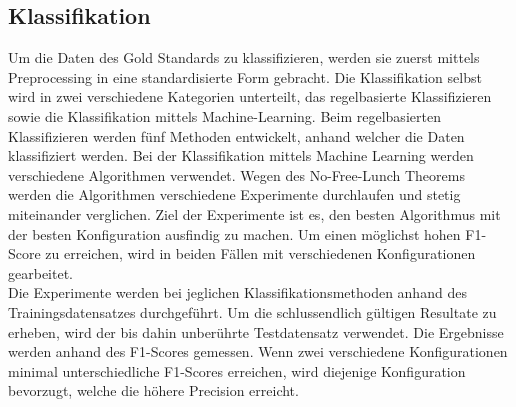 \subsection{Klassifikation}
Um die Daten des Gold Standards zu klassifizieren, werden sie zuerst mittels Preprocessing in eine standardisierte Form gebracht.
Die Klassifikation selbst wird in zwei verschiedene Kategorien unterteilt, das regelbasierte Klassifizieren sowie die Klassifikation mittels Machine-Learning.
Beim regelbasierten Klassifizieren werden fünf Methoden entwickelt, anhand welcher die Daten klassifiziert werden.
Bei der Klassifikation mittels Machine Learning werden verschiedene Algorithmen verwendet.
Wegen des \glqq No-Free-Lunch\grqq{} Theorems werden die Algorithmen verschiedene Experimente durchlaufen und stetig miteinander verglichen.
Ziel der Experimente ist es, den besten Algorithmus mit der besten Konfiguration ausfindig zu machen.
Um einen möglichst hohen F1-Score zu erreichen, wird in beiden Fällen mit verschiedenen Konfigurationen gearbeitet.\\
Die Experimente werden bei jeglichen Klassifikationsmethoden anhand des Trainingsdatensatzes durchgeführt.
Um die schlussendlich gültigen Resultate zu erheben, wird der bis dahin unberührte Testdatensatz verwendet.
Die Ergebnisse werden anhand des F1-Scores gemessen.
Wenn zwei verschiedene Konfigurationen minimal unterschiedliche F1-Scores erreichen, wird diejenige Konfiguration bevorzugt, welche die höhere Precision erreicht.
